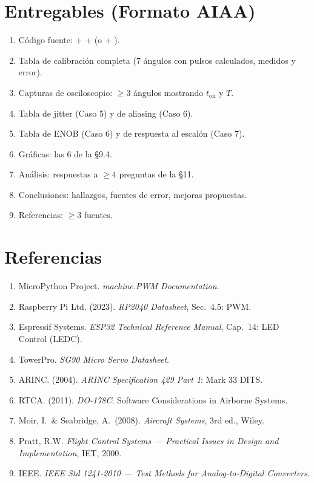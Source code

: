 \documentclass[11pt]{article}
\begin{document}
\section{Entregables (Formato AIAA)}
\begin{enumerate}
  \item Código fuente:  +  + 
        (o  + ).
  \item Tabla de calibración completa (7 ángulos con pulsos calculados, medidos y error).
  \item Capturas de osciloscopio: $\ge 3$ ángulos mostrando $t_\text{on}$ y $T$.
  \item Tabla de jitter (Caso 5) y de aliasing (Caso 6).
  \item Tabla de ENOB (Caso 6) y de respuesta al escalón (Caso 7).
  \item Gráficas: las 6 de la \S9.4.
  \item Análisis: respuestas a $\ge 4$ preguntas de la \S11.
  \item Conclusiones: hallazgos, fuentes de error, mejoras propuestas.
  \item Referencias: $\ge 3$ fuentes.
\end{enumerate}

\section{Referencias}
\begin{enumerate}
  \item MicroPython Project. \emph{machine.PWM Documentation}.
  \item Raspberry Pi Ltd. (2023). \emph{RP2040 Datasheet}, Sec.\ 4.5: PWM.
  \item Espressif Systems. \emph{ESP32 Technical Reference Manual}, Cap.\ 14: LED Control (LEDC).
  \item TowerPro. \emph{SG90 Micro Servo Datasheet}.
  \item ARINC. (2004). \emph{ARINC Specification 429 Part 1}: Mark 33 DITS.
  \item RTCA. (2011). \emph{DO-178C}: Software Considerations in Airborne Systems.
  \item Moir, I.\ \& Seabridge, A.\ (2008). \emph{Aircraft Systems}, 3rd ed., Wiley.
  \item Pratt, R.W. \emph{Flight Control Systems --- Practical Issues in Design and
        Implementation}, IET, 2000.
  \item IEEE. \emph{IEEE Std 1241-2010 --- Test Methods for Analog-to-Digital Converters}.
\end{enumerate}
\end{document}
